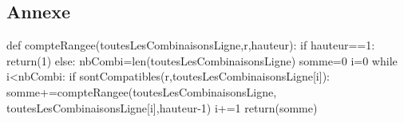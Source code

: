 \subsection*{Annexe}
\footnotesize{
\begin{python}
def compteRangee(toutesLesCombinaisonsLigne,r,hauteur):
  if hauteur==1:
    return(1)
  else:
    nbCombi=len(toutesLesCombinaisonsLigne)
    somme=0
    i=0
    while i<nbCombi:
      if sontCompatibles(r,toutesLesCombinaisonsLigne[i]):
          somme+=compteRangee(toutesLesCombinaisonsLigne,
              toutesLesCombinaisonsLigne[i],hauteur-1)
      i+=1
  return(somme)
\end{python}}